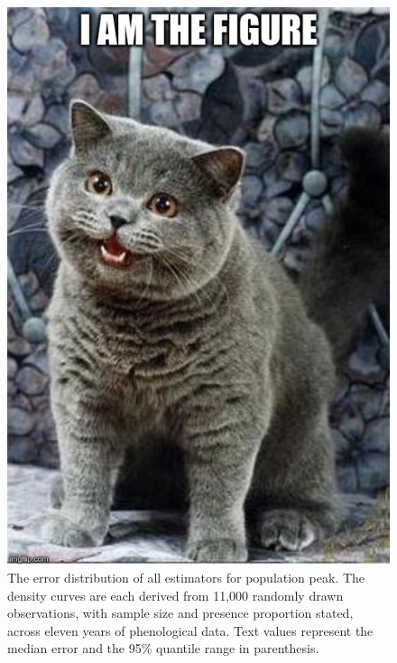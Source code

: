 \begin{figure}
	\centering
		\includegraphics[scale=0.3]{images/figure_filler.jpg}
	\caption[The error distribution of all estimators for population peak]{The error distribution of all estimators for population peak. The density curves are each derived from 11,000 randomly drawn observations, with sample size and presence proportion stated, across eleven years of phenological data. Text values represent the median error and the 95\% quantile range in parenthesis.} \label{fig-3-3}
\end{figure}

